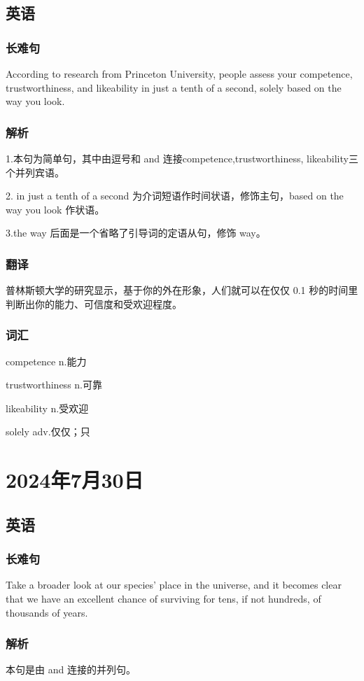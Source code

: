 \documentclass[UTF8]{ctexart}
\begin{document}
\subsection{英语}
\subsubsection{长难句}
According to research from Princeton University, people assess your competence, trustworthiness, and likeability in just a tenth of a second, solely based on the way you look.
\subsubsection{解析}
1.本句为简单句，其中由逗号和 and 连接competence,trustworthiness, likeability三个并列宾语。

2. in just a tenth of a second 为介词短语作时间状语，修饰主句，based on the way you look 作状语。

3.the way 后面是一个省略了引导词的定语从句，修饰 way。
\subsubsection{翻译}
普林斯顿大学的研究显示，基于你的外在形象，人们就可以在仅仅 0.1 秒的时间里判断出你的能力、可信度和受欢迎程度。
\subsubsection{词汇}
\begin{multicols}{2}
      competence n.能力

      trustworthiness n.可靠

      likeability  n.受欢迎

      solely  adv.仅仅；只
\end{multicols}
\section{2024年7月30日}
\subsection{英语}
\subsubsection{长难句}
Take a broader look at our species' place in the universe, and it becomes clear that we have an excellent chance of surviving for tens, if not hundreds, of thousands of years.
\subsubsection{解析}
本句是由 and 连接的并列句。
\end{document}
